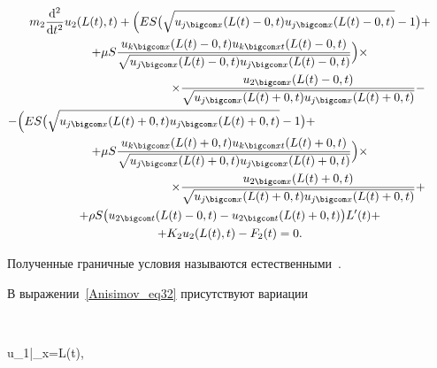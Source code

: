 \begin{multline}\nonumber

m_2\frac{\mathrm{d}^2 }{\mathrm{d}t^2} u_2( L(t), t )

+\Bigl(

ES\bigl(\sqrt{u_{j \bigcom x}(L(t)-0, t)u_{j \bigcom x}(L(t)-0, t)}-1\bigr)+\\

+\mu S\frac{u_{k \bigcom x}(L(t)-0, t)u_{k \bigcom xt}(L(t)-0, t)} {\sqrt{u_{j \bigcom x}(L(t)-0, t)u_{j \bigcom x}(L(t)-0, t)}}\Bigr)

\times 

\\

\hspace{4cm}

\times 

\frac{u_{2 \bigcom x}(L(t)-0, t)} {\sqrt{u_{j \bigcom x}(L(t)+0, t)u_{j \bigcom x}(L(t)+0, t)}}-\\

-\Bigl(

ES\bigl(\sqrt{u_{j \bigcom x}(L(t)+0, t)u_{j \bigcom x}(L(t)+0, t)}-1\bigr)+\hspace{4cm}\\

+\mu S\frac{u_{k \bigcom x}(L(t)+0, t)u_{k \bigcom xt}(L(t)+0, t)} {\sqrt{u_{j \bigcom x}(L(t)+0, t)u_{j \bigcom x}(L(t)+0, t)}}\Bigr) \times 

\\

\hspace{4cm}

\times 

\frac{u_{2 \bigcom x}(L(t)+0, t)} {\sqrt{u_{j \bigcom x}(L(t)+0, t)u_{j \bigcom x}(L(t)+0, t)}}+\\

+\rho S\bigl(u_{2 \bigcom t}(L(t)-0, t)- u_{2 \bigcom t}(L(t)+0, t)\bigr)L'(t)+ \\ + K_2u_2( L(t), t )-F_2(t)=0.

\end{multline}



Полученные граничные условия называются естественными~\cite{Anisimov_bib17}.



В выражении~\eqref{Anisimov_eq32} присутствуют вариации 

$$ 

\delta u_1\big|_{x=L(t)},\quad  

